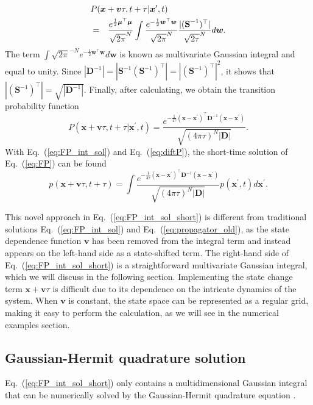\documentclass[aps,pre,reprint,superscriptaddress,showpacs,amsmath
,floatfix
]{revtex4-2}
\renewcommand{\vec}[1]{\boldsymbol{#1}}
\newcommand{\mat}[1]{\textbf{#1}}
\newcommand{\eq}[1]{Eq.~(\ref{#1})}
\begin{document}
\begin{eqnarray}
\label{eq:dift_P_2}
\lefteqn{
P(\vec{x}+\vec{v}\tau,t+\tau|\vec{x}^\prime,t) } \nonumber\\
&=& \frac{ e^{\frac{1}{2} \vec{\mu}^\top \vec{\mu}} }{ \sqrt{2\pi}^{N} }  \int \frac{ e^{-\frac{1}{2} \vec{w}^\top \vec{w}} }{ \sqrt{2\pi}^{N} } \frac{ |(\mat{S}^{-1})^\top| }{ \sqrt{2\tau}^{N} } d\vec{w} .
\end{eqnarray}
The term $\int \sqrt{2\pi}^{-N} e^{-\frac{1}{2} \vec{w}^\top \vec{w}} d\vec{w}$ is known as multivariate Gaussian integral and equal to unity. Since $|\mat{D}^{-1}| = |\mat{S}^{-1}(\mat{S}^{-1})^\top| = |(\mat{S}^{-1})^\top|^2$, it shows that $|(\mat{S}^{-1})^\top| = \sqrt{|\mat{D}^{-1}|}$. Finally, after calculating, we obtain the transition probability function 
\begin{equation}
\label{eq:diftP}
P(\vec{x}+\vec{v}\tau,t+\tau|\vec{x}^\prime,t) = \frac{ e^{-\frac{1}{4\tau} (\vec{x}-\vec{x}^\prime)^\top \mat{D}^{-1} (\vec{x}-\vec{x}^\prime)} }{\sqrt{(4\pi\tau)^N |\mat{D}|}} .
\end{equation}
With \eq{eq:FP_int_sol} and \eq{eq:diftP}, the short-time solution of \eq{eq:FP} can be found
\begin{equation}
\label{eq:FP_int_sol_short}
p(\vec{x}+\vec{v}\tau,t+\tau) = \int \frac{ e^{-\frac{1}{4\tau} (\vec{x}-\vec{x}^\prime)^\top \mat{D}^{-1} (\vec{x}-\vec{x}^\prime)} }{\sqrt{(4\pi\tau)^N |\mat{D}|}} p(\vec{x}^\prime,t) d\vec{x}^\prime .
\end{equation}

This novel approach in \eq{eq:FP_int_sol_short} is different from traditional solutions \eq{eq:FP_int_sol} and \eq{eq:propagator_old}, as the state dependence function $\vec{v}$ has been removed from the integral term and instead appears on the left-hand side as a state-shifted term. The right-hand side of \eq{eq:FP_int_sol_short} is a straightforward multivariate Gaussian integral, which we will discuss in the following section. Implementing the state change term $\vec{x}+\vec{v}\tau$ is difficult due to its dependence on the intricate dynamics of the system. When $\vec{v}$ is constant, the state space can be represented as a regular grid, making it easy to perform the calculation, as we will see in the numerical examples section.

\subsection{Gaussian-Hermit quadrature solution}
\eq{eq:FP_int_sol_short} only contains a multidimensional Gaussian integral that can be numerically solved by the Gaussian-Hermit quadrature equation \cite{abramowitz1972handbook, NumericalRecipes}.
\end{document}
